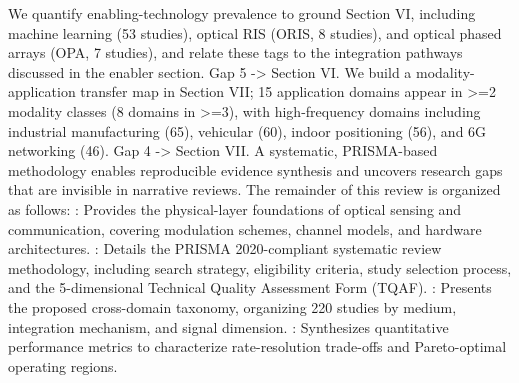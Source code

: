  We quantify enabling-technology prevalence to ground Section VI, including machine learning (53 studies), optical RIS (ORIS, 8 studies), and optical phased arrays (OPA, 7 studies), and relate these tags to the integration pathways discussed in the enabler section.  Gap 5 -> Section VI.\markdownRendererOlItemEnd 
{} We build a modality-application transfer map in Section VII; 15 application domains appear in >=2 modality classes (8 domains in >=3), with high-frequency domains including industrial manufacturing (65), vehicular (60), indoor positioning (56), and 6G networking (46).  Gap 4 -> Section VII.\markdownRendererOlItemEnd 
\markdownRendererOlEnd \markdownRendererInterblockSeparator
{}\markdownRendererBlockQuoteBegin
{} A systematic, PRISMA-based methodology enables reproducible evidence synthesis and uncovers research gaps that are invisible in narrative reviews.\markdownRendererBlockQuoteEnd \markdownRendererInterblockSeparator
{}
\markdownRendererSectionEnd \markdownRendererSectionBegin
{}\markdownRendererInterblockSeparator
{}The remainder of this review is organized as follows:\markdownRendererInterblockSeparator
{}\markdownRendererUlBegin
\markdownRendererUlItem {}: Provides the physical-layer foundations of optical sensing and communication, covering modulation schemes, channel models, and hardware architectures.\markdownRendererUlItemEnd 
\markdownRendererUlItem {}: Details the PRISMA 2020-compliant systematic review methodology, including search strategy, eligibility criteria, study selection process, and the 5-dimensional Technical Quality Assessment Form (TQAF).\markdownRendererUlItemEnd 
\markdownRendererUlItem {}: Presents the proposed cross-domain taxonomy, organizing 220 studies by medium, integration mechanism, and signal dimension.\markdownRendererUlItemEnd 
\markdownRendererUlItem {}: Synthesizes quantitative performance metrics to characterize rate-resolution trade-offs and Pareto-optimal operating regions.\markdownRendererUlItemEnd 
